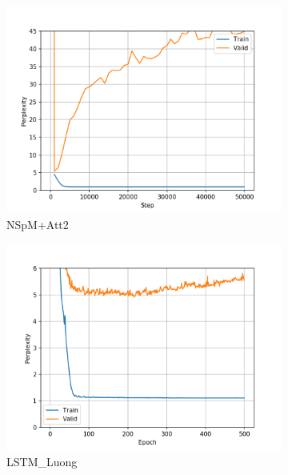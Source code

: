 \begin{figure}[H]
\begin{subfigure}{0.45\textwidth}
\includegraphics[width=\textwidth]{../results/lc-quad1/run1/neural_sparql_machine_luong_attention/ppls.png} 
\caption{NSpM+Att2}
\label{fig:lcquad nsm-luo ppl}
\end{subfigure}
\hfill
\begin{subfigure}{0.45\textwidth}
\includegraphics[width=\textwidth]{../results/lc-quad1/run1/lstm_luong_wmt_en_de/ppls.png}
\caption{LSTM\_Luong}
\label{fig:lcquad lstm ppl}
\end{subfigure}
\hfill
\begin{subfigure}{0.45\textwidth}

\end{subfigure}
\end{figure}
